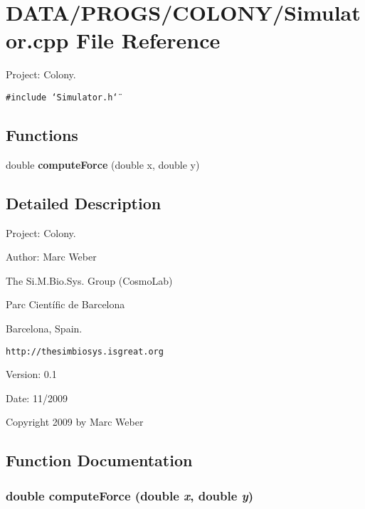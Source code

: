 \section{DATA/PROGS/COLONY/Simulator.cpp File Reference}
\label{Simulator_8cpp}
Project: Colony. 

{\tt \#include \char`\"{}Simulator.h\char`\"{}}\par
\subsection*{Functions}
\begin{CompactItemize}
\item 
double {\bf computeForce} (double x, double y)
\end{CompactItemize}


\subsection{Detailed Description}
Project: Colony. 

\begin{Desc}
\item[Author:]Marc Weber\par
 The Si.M.Bio.Sys. Group (CosmoLab)\par
 Parc Científic de Barcelona\par
 Barcelona, Spain.\par
 {\tt http://thesimbiosys.isgreat.org} \end{Desc}
\begin{Desc}
\item[Version:]0.1 \end{Desc}
\begin{Desc}
\item[Date:]11/2009\end{Desc}
Copyright 2009 by Marc Weber 

\subsection{Function Documentation}
\subsubsection{\setlength{\rightskip}{0pt plus 5cm}double computeForce (double {\em x}, \/  double {\em y})}\label{Simulator_8cpp_585a99088a971d421303826cb3c43774}


